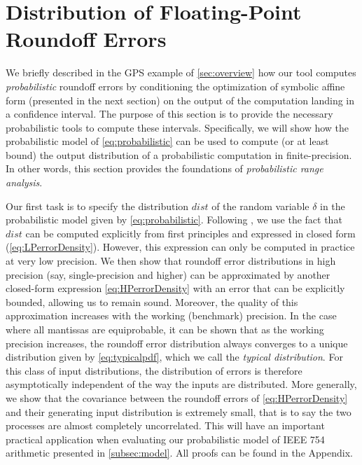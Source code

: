 \section{Distribution of Floating-Point Roundoff Errors}\label{sec:errordist}

We briefly described in the GPS example of \cref{sec:overview} how our tool \Tool computes \emph{probabilistic} roundoff errors by conditioning the optimization of symbolic affine form (presented in the next section) on the output of the computation landing in a confidence interval.  The purpose of this section is to provide the necessary probabilistic tools to compute these intervals. Specifically, we will show how the probabilistic model of \cref{eq:probabilistic} can be used to compute (or at least bound) the output distribution of a probabilistic computation in finite-precision. In other words, this section provides the foundations of \emph{probabilistic range analysis}.

Our first task is to specify the distribution $dist$ of the random variable $\delta$ in the probabilistic model given by \cref{eq:probabilistic}.  Following \cite{dahlqvist2019probabilistic},  we use the fact that $dist$ can be computed explicitly from first principles and expressed in closed form (\cref{eq:LPerrorDensity}).  However,  this expression can only be computed in practice at very low precision. We then show that roundoff error distributions in high precision (say, single-precision and higher) can be approximated by another closed-form expression \cref{eq:HPerrorDensity} with an error that can be explicitly bounded, allowing us to remain sound.  Moreover, the quality of this approximation increases with the working (\ie benchmark) precision.  In the case where all mantissas are equiprobable,  it can be shown that as the working precision increases,  the roundoff error distribution always converges to a unique distribution given by \cref{eq:typicalpdf}, which we call the \emph{typical distribution}.  
For this class of input distributions, the distribution of errors is therefore asymptotically independent of the way the inputs are distributed.  More generally, we show that the covariance between the roundoff errors of \cref{eq:HPerrorDensity} and their generating input distribution is extremely small, that is to say the two processes are almost completely uncorrelated. This will have an important practical application when evaluating our probabilistic model of IEEE 754 arithmetic presented in \cref{subsec:model}. All proofs can be found in the Appendix.

